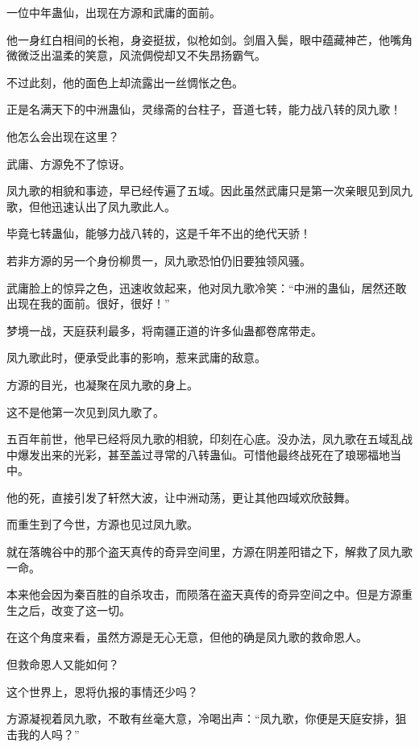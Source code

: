 
\begin{this_body}

一位中年蛊仙，出现在方源和武庸的面前。

他一身红白相间的长袍，身姿挺拔，似枪如剑。剑眉入鬓，眼中蕴藏神芒，他嘴角微微泛出温柔的笑意，风流倜傥却又不失昂扬霸气。

不过此刻，他的面色上却流露出一丝惆怅之色。

正是名满天下的中洲蛊仙，灵缘斋的台柱子，音道七转，能力战八转的凤九歌！

他怎么会出现在这里？

武庸、方源免不了惊讶。

凤九歌的相貌和事迹，早已经传遍了五域。因此虽然武庸只是第一次亲眼见到凤九歌，但他迅速认出了凤九歌此人。

毕竟七转蛊仙，能够力战八转的，这是千年不出的绝代天骄！

若非方源的另一个身份柳贯一，凤九歌恐怕仍旧要独领风骚。

武庸脸上的惊异之色，迅速收敛起来，他对凤九歌冷笑：“中洲的蛊仙，居然还敢出现在我的面前。很好，很好！”

梦境一战，天庭获利最多，将南疆正道的许多仙蛊都卷席带走。

凤九歌此时，便承受此事的影响，惹来武庸的敌意。

方源的目光，也凝聚在凤九歌的身上。

这不是他第一次见到凤九歌了。

五百年前世，他早已经将凤九歌的相貌，印刻在心底。没办法，凤九歌在五域乱战中爆发出来的光彩，甚至盖过寻常的八转蛊仙。可惜他最终战死在了琅琊福地当中。

他的死，直接引发了轩然大波，让中洲动荡，更让其他四域欢欣鼓舞。

而重生到了今世，方源也见过凤九歌。

就在落魄谷中的那个盗天真传的奇异空间里，方源在阴差阳错之下，解救了凤九歌一命。

本来他会因为秦百胜的自杀攻击，而陨落在盗天真传的奇异空间之中。但是方源重生之后，改变了这一切。

在这个角度来看，虽然方源是无心无意，但他的确是凤九歌的救命恩人。

但救命恩人又能如何？

这个世界上，恩将仇报的事情还少吗？

方源凝视着凤九歌，不敢有丝毫大意，冷喝出声：“凤九歌，你便是天庭安排，狙击我的人吗？”


\end{this_body}
